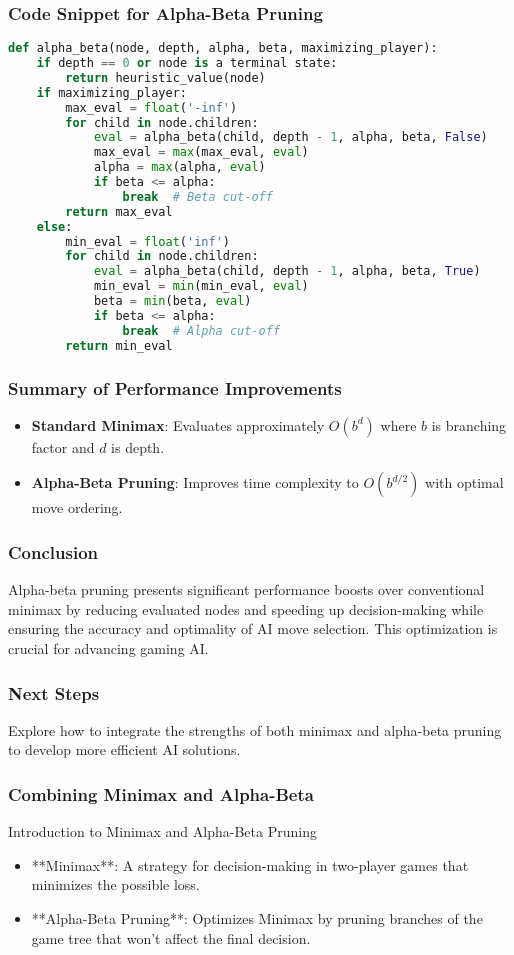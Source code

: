 \documentclass[aspectratio=169]{beamer}
\begin{document}
\begin{frame}[fragile]
    \frametitle{Code Snippet for Alpha-Beta Pruning}
    \begin{lstlisting}[language=Python]
def alpha_beta(node, depth, alpha, beta, maximizing_player):
    if depth == 0 or node is a terminal state:
        return heuristic_value(node)
    if maximizing_player:
        max_eval = float('-inf')
        for child in node.children:
            eval = alpha_beta(child, depth - 1, alpha, beta, False)
            max_eval = max(max_eval, eval)
            alpha = max(alpha, eval)
            if beta <= alpha:
                break  # Beta cut-off
        return max_eval
    else:
        min_eval = float('inf')
        for child in node.children:
            eval = alpha_beta(child, depth - 1, alpha, beta, True)
            min_eval = min(min_eval, eval)
            beta = min(beta, eval)
            if beta <= alpha:
                break  # Alpha cut-off
        return min_eval
    \end{lstlisting}
\end{frame}

\begin{frame}
    \frametitle{Summary of Performance Improvements}
    \begin{itemize}
        \item \textbf{Standard Minimax}: Evaluates approximately \(O(b^d)\) where \(b\) is branching factor and \(d\) is depth.
        \item \textbf{Alpha-Beta Pruning}: Improves time complexity to \(O(b^{d/2})\) with optimal move ordering.
    \end{itemize}
\end{frame}

\begin{frame}
    \frametitle{Conclusion}
    Alpha-beta pruning presents significant performance boosts over conventional minimax by reducing evaluated nodes and speeding up decision-making while ensuring the accuracy and optimality of AI move selection. This optimization is crucial for advancing gaming AI.
\end{frame}

\begin{frame}
    \frametitle{Next Steps}
    Explore how to integrate the strengths of both minimax and alpha-beta pruning to develop more efficient AI solutions.
\end{frame}

\begin{frame}[fragile]
    \frametitle{Combining Minimax and Alpha-Beta}
    \begin{block}{Introduction to Minimax and Alpha-Beta Pruning}
        \begin{itemize}
            \item **Minimax**: A strategy for decision-making in two-player games that minimizes the possible loss.
            \item **Alpha-Beta Pruning**: Optimizes Minimax by pruning branches of the game tree that won't affect the final decision.
        \end{itemize}
    \end{block}
\end{frame}
\end{document}
